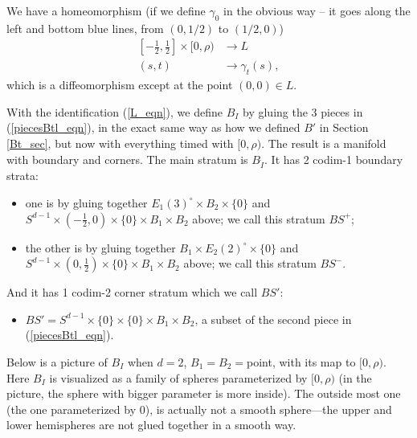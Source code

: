 \documentclass[11pt]{article}
\theoremstyle{definition}
\theoremstyle{remark}
\def\rI{{\mathring{I}}}
\begin{document}
We have a homeomorphism (if we define $\gamma_0$ in the obvious way -- it goes along the left and bottom blue lines, from $(0,1/2)$ to $(1/2,0)$)
\begin{align}\label{L_eqn}
[-\frac{1}{2},\frac{1}{2}]\times[0,\rho)&\longrightarrow L\\
(s,t)&\longrightarrow \gamma_t(s),\nonumber
\end{align}
which is a diffeomorphism except at the point $(0,0)\in L$. 

With the identification (\ref{L_eqn}), we define $B_I$ by gluing the 3 pieces in (\ref{piecesBtl_eqn}), in the exact same way as how we defined $B'$ in Section \ref{Bt_sec}, but now with everything timed with $[0,\rho)$. 
The result is a manifold with boundary and corners. 
The main stratum is $B_\rI$. 
It has 2 codim-1 boundary strata: 
\begin{itemize}
\item one is by gluing together $E_1(3)^\circ\times B_2\times\{0\}$ and $S^{d-1}\times(-\frac{1}{2},0)\times\{0\}\times B_1\times B_2$ above; we call this stratum $BS^+$;
\item the other is by gluing together $B_1\times E_2(2)^\circ\times\{0\}$ and $S^{d-1}\times(0,\frac{1}{2})\times\{0\}\times B_1\times B_2$ above; we call this stratum $BS^-$.
\end{itemize}
And it has 1 codim-2 corner stratum which we call $BS'$:
\begin{itemize}
\item $BS'=S^{d-1}\times\{0\}\times\{0\}\times B_1\times B_2$, a subset of the second piece in (\ref{piecesBtl_eqn}). 
\end{itemize}

Below is a picture of $B_I$ when $d=2$, $B_1=B_2=$point, with its map to $[0,\rho)$. Here $B_I$ is visualized as a family of spheres parameterized by $[0,\rho)$ (in the picture, the sphere with bigger parameter is more inside). The outside most one (the one parameterized by $0$), is actually not a smooth sphere---the upper and lower hemispheres are not glued together in a smooth way. 
\end{document}
